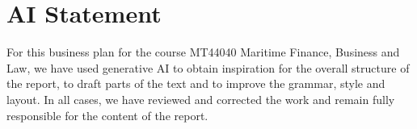 \documentclass[
  oneside, %
]{tudelft-report}[2026/06/01]
\begin{document}
\frontmatter


\mainmatter%




\printbibliography[heading=subbibintoc, title={References}]

\section*{AI Statement}
{\footnotesize
For this business plan for the course MT44040 Maritime Finance, Business and Law, we have used generative AI to obtain inspiration for the overall structure of the report, to draft parts of the text and to improve the grammar, style and layout. In all cases, we have reviewed and corrected the work and remain fully responsible for the content of the report.
\par}

\end{document}
